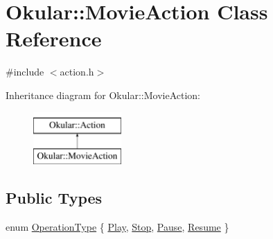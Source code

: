 \hypertarget{classOkular_1_1MovieAction}{\section{Okular\+:\+:Movie\+Action Class Reference}
\label{classOkular_1_1MovieAction}
}


{\ttfamily \#include $<$action.\+h$>$}

Inheritance diagram for Okular\+:\+:Movie\+Action\+:\begin{figure}[H]
\begin{center}
\leavevmode
\includegraphics[height=2.000000cm]{classOkular_1_1MovieAction}
\end{center}
\end{figure}
\subsection*{Public Types}
\begin{DoxyCompactItemize}
\item 
enum \hyperlink{classOkular_1_1MovieAction_ade5698179043c1075b37aa1dc7638331}{Operation\+Type} \{ \hyperlink{classOkular_1_1MovieAction_ade5698179043c1075b37aa1dc7638331a4b5f94f7e4ee44aebe6d3a2838182e89}{Play}, 
\hyperlink{classOkular_1_1MovieAction_ade5698179043c1075b37aa1dc7638331a368dd1ed322e0906a89a36bcaf746433}{Stop}, 
\hyperlink{classOkular_1_1MovieAction_ade5698179043c1075b37aa1dc7638331a4dd1333e70352ea60c08c6e43d9988ed}{Pause}, 
\hyperlink{classOkular_1_1MovieAction_ade5698179043c1075b37aa1dc7638331a1240ff2be757441b04f4d63e40b1653c}{Resume}
 \}
\end{DoxyCompactItemize}
